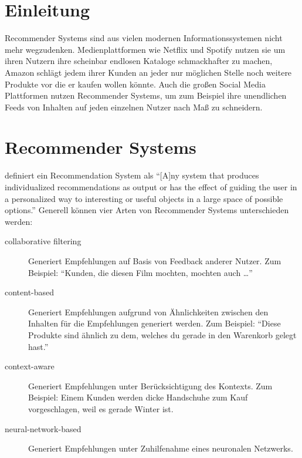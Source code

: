
\section{Einleitung}

Recommender Systems sind aus vielen modernen Informationssystemen nicht mehr wegzudenken.
Medienplattformen wie Netflix und Spotify nutzen sie um ihren Nutzern ihre scheinbar endlosen Kataloge schmackhafter zu machen, Amazon schlägt jedem ihrer Kunden an jeder nur möglichen Stelle noch weitere Produkte vor die er kaufen wollen könnte.
Auch die großen Social Media Plattformen nutzen Recommender Systems, um zum Beispiel ihre unendlichen Feeds von Inhalten auf jeden einzelnen Nutzer nach Maß zu schneidern.

\section{Recommender Systems}

\citeauthor{burke_hybrid_2002} definiert ein Recommendation System als \enquote{[A]ny system that produces individualized recommendations as output or has the effect of guiding the user in a personalized way to interesting or useful objects in a large space of possible options.} \parencite{burke_hybrid_2002}
Generell können vier Arten von Recommender Systems unterschieden werden:

\begin{description}
  \item[collaborative filtering] Generiert Empfehlungen auf Basis von Feedback anderer Nutzer. Zum Beispiel: \enquote{Kunden, die diesen Film mochten, mochten auch \ldots}
  \parencite{koren_advances_2022}
  \item[content-based] Generiert Empfehlungen aufgrund von Ähnlichkeiten zwischen den Inhalten für die Empfehlungen generiert werden. Zum Beispiel: \enquote{Diese Produkte sind ähnlich zu dem, welches du gerade in den Warenkorb gelegt hast.}
  \parencite{musto_semantics_2022}
  \item[context-aware] Generiert Empfehlungen unter Berücksichtigung des Kontexts. Zum Beispiel: Einem Kunden werden dicke Handschuhe zum Kauf vorgeschlagen, weil es gerade Winter ist.
  \parencite{adomavicius_context-aware_2022}
  \item[neural-network-based] Generiert Empfehlungen unter Zuhilfenahme eines neuronalen Netzwerks.
  \parencite{zhang_deep_2022}
\end{description}

